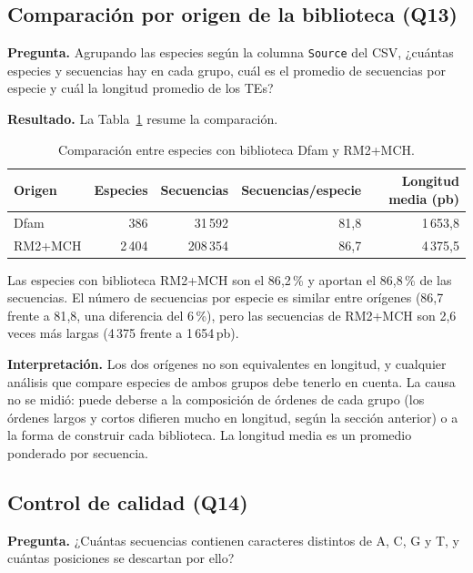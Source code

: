 \subsection{Comparación por origen de la biblioteca (Q13)}
 
\textbf{Pregunta.} Agrupando las especies según la columna \texttt{Source}
del CSV, ¿cuántas especies y secuencias hay en cada grupo, cuál es el
promedio de secuencias por especie y cuál la longitud promedio de los TEs?
 
\textbf{Resultado.} La Tabla~\ref{tab:origen} resume la comparación.
 
\begin{table}[htbp]
\centering
\caption{Comparación entre especies con biblioteca Dfam y RM2+MCH.}
\label{tab:origen}
\begin{tabular}{lrrrr}
\hline
Origen & Especies & Secuencias & Secuencias/especie & Longitud media (pb) \\
\hline
Dfam    & 386    & 31\,592  & 81{,}8 & 1\,653{,}8 \\
RM2+MCH & 2\,404 & 208\,354 & 86{,}7 & 4\,375{,}5 \\
\hline
\end{tabular}
\end{table}
 
Las especies con biblioteca RM2+MCH son el 86{,}2\,\% y aportan el
86{,}8\,\% de las secuencias. El número de secuencias por especie es
similar entre orígenes (86{,}7 frente a 81{,}8, una diferencia del
6\,\%), pero las secuencias de RM2+MCH son 2{,}6 veces más largas
(4\,375 frente a 1\,654\,pb).
 
\textbf{Interpretación.} Los dos orígenes no son equivalentes en
longitud, y cualquier análisis que compare especies de ambos grupos debe
tenerlo en cuenta. La causa no se midió: puede deberse a la composición
de órdenes de cada grupo (los órdenes largos y cortos difieren mucho en
longitud, según la sección anterior) o a la forma de construir cada
biblioteca. La longitud media es un promedio ponderado por secuencia.
 
\subsection{Control de calidad (Q14)}
 
\textbf{Pregunta.} ¿Cuántas secuencias contienen caracteres distintos de
A, C, G y T, y cuántas posiciones se descartan por ello?
 
